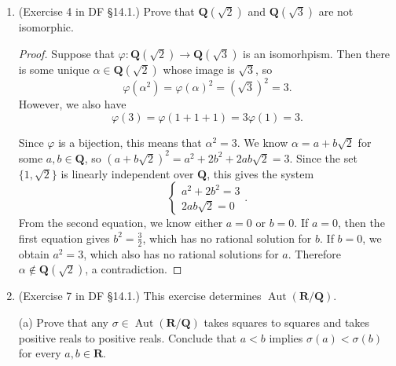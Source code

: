 \documentclass[10pt]{article}
\newcommand{\Q}{\mathbf{Q}}
\DeclareMathOperator*{\Aut}{Aut}
\begin{document}
\begin{enumerate}
\begin{proof}
Clearly, $\varphi \neq 0$, since $\varphi(1) = T_1$ is the identity map, which is nonzero.  The image of a nonzero field homomorphism is a field, thus $\varphi$ is an isomorphism onto a subfield of $M_n(F)$.

\end{proof}






\item (Exercise 4 in DF \S 14.1.) Prove that $\mathbf{Q}(\sqrt{2})$ and $\mathbf{Q}(\sqrt{3})$ are not isomorphic.



\begin{proof}

Suppose that $\varphi: \Q(\sqrt{2}) \rightarrow \Q(\sqrt{3})$ is an isomorhpism.  Then there is some unique $\alpha \in \Q(\sqrt{2})$ whose image is $\sqrt{3}$, so $$\varphi(\alpha^2) = \varphi(\alpha)^2 = (\sqrt{3})^2 = 3.$$  However, we also have $$ \varphi(3) = \varphi(1 + 1 + 1) = 3\varphi(1) = 3.$$

Since $\varphi$ is a bijection, this means that $\alpha^2 = 3$.  We know $\alpha = a + b\sqrt{2}$ for some $a,b \in \Q$, so $(a + b\sqrt{2})^2 = a^2 + 2b^2 + 2ab\sqrt{2} = 3$.  Since the set $\{1, \sqrt{2} \}$ is linearly independent over $\Q$, this gives the system
$$\begin{cases}
a^2 + 2b^2 = 3 \\
2ab \sqrt{2} = 0
\end{cases}.$$  From the second equation, we know either $a = 0$ or $b = 0$.  If $a = 0$, then the first equation gives $b^2 = \frac{3}{2}$, which has no rational solution for $b$.  If $b = 0$, we obtain $a^2 = 3$, which also has no rational solutions for $a$.  Therefore $\alpha \not \in \Q(\sqrt{2})$, a contradiction.

\end{proof}










\item (Exercise 7 in DF \S 14.1.) This exercise determines $\Aut(\mathbf{R}/\mathbf{Q})$.

(a) Prove that any $\sigma \in \Aut(\mathbf{R}/\mathbf{Q})$ takes squares to squares and takes positive reals to positive reals.  Conclude that $a<b$ implies $\sigma(a)<\sigma(b)$ for every $a,b \in \mathbf{R}$.



\end{enumerate}
\end{document}
